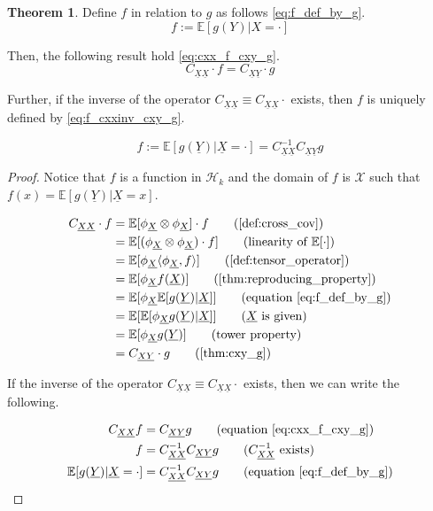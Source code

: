 \documentclass[twoside]{article} \usepackage{aistats2017}
\theoremstyle{definition}
\newtheorem{theorem}{Theorem}[section]
\newcommand{\rv}[1]{\underline{#1}}
\newcommand{\expect}[1]{{\mathbb{E}[#1]}}
\newcommand{\inner}[2]{{\langle #1, #2 \rangle}}
\newcommand{\phiX}{\phi_{\rv{X}}}
\newcommand{\Cxy}{C_{\rv{X} \rv{Y}}}
\newcommand{\Cxx}{C_{\rv{X} \rv{X}}}
\begin{document}
	\begin{theorem} \label{thm:cxx_f_cxy_g}
		Define $f$ in relation to $g$ as follows \eqref{eq:f_def_by_g}.
		\begin{equation}
			f := \expect{g(Y) | X = \cdot}
		\label{eq:f_def_by_g}
		\end{equation}
		
		Then, the following result hold \eqref{eq:cxx_f_cxy_g}.
		\begin{equation}
			\Cxx \cdot f = \Cxy \cdot g
		\label{eq:cxx_f_cxy_g}
		\end{equation}
		
		Further, if the inverse of the operator $\Cxx \equiv \Cxx \cdot$ exists, then $f$ is uniquely defined by \eqref{eq:f_cxxinv_cxy_g}.
		
		\begin{equation}
			f := \expect{g(\rv{Y}) | \rv{X} = \cdot} = \Cxx^{-1} \Cxy g
		\label{eq:f_cxxinv_cxy_g}
		\end{equation}

		\begin{proof}
		Notice that $f$ is a function in $\mathcal{H}_{k}$ and the domain of $f$ is $\mathcal{X}$ such that $f(x) = \expect{g(\rv{Y}) | \rv{X} = x}$.
		
		\begin{align*}
			\Cxx \cdot f &= \expect{\phiX \otimes \phiX} \cdot f \tag{\cref{def:cross_cov}} \\
			&= \expect{(\phiX \otimes \phiX) \cdot f} \tag{linearity of $\expect{\cdot}$} \\
			&= \expect{\phiX \inner{\phiX}{f}} \tag{\cref{def:tensor_operator}} \\
			&= \expect{\phiX f(\rv{X})} \tag{\cref{thm:reproducing_property}} \\
			&= \expect{\phiX \expect{g(\rv{Y}) | \rv{X}}} \tag{equation \eqref{eq:f_def_by_g}} \\
			&= \expect{\expect{\phiX g(\rv{Y}) | \rv{X}}} \tag{$\rv{X}$ is given} \\
			&= \expect{\phiX g(\rv{Y})} \tag{tower property} \\
			&= \Cxy \cdot g \tag{\cref{thm:cxy_g}}
		\end{align*}
		
		If the inverse of the operator $\Cxx \equiv \Cxx \cdot$ exists, then we can write the following.
		
		\begin{align*}
			\Cxx f &= \Cxy g \tag{equation \eqref{eq:cxx_f_cxy_g}} \\
			f &= \Cxx^{-1} \Cxy g \tag{$\Cxx^{-1}$ exists} \\
			\expect{g(\rv{Y}) | \rv{X} = \cdot} &= \Cxx^{-1} \Cxy g \tag{equation \eqref{eq:f_def_by_g}}
		\end{align*}
		
		\end{proof}
	\end{theorem}
\end{document}
